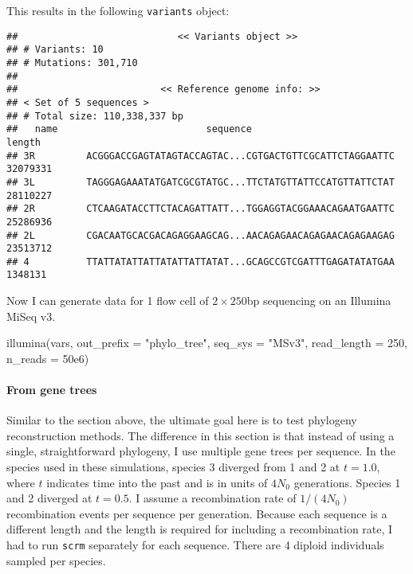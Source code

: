 \documentclass[12pt,]{article}
\newenvironment{Shaded}{}{}
\newcommand{\DataTypeTok}[1]{#1}
\newcommand{\DecValTok}[1]{#1}
\newcommand{\FloatTok}[1]{#1}
\newcommand{\KeywordTok}[1]{\textcolor[rgb]{0.00,0.00,1.00}{#1}}
\newcommand{\NormalTok}[1]{#1}
\newcommand{\StringTok}[1]{\textcolor[rgb]{0.00,0.50,0.50}{#1}}
\let\oldparagraph\paragraph
\renewcommand{\paragraph}[1]{\oldparagraph{#1}\mbox{}}
\begin{document}
This results in the following \texttt{variants} object:

\begin{verbatim}
##                            << Variants object >>
## # Variants: 10
## # Mutations: 301,710
## 
##                         << Reference genome info: >>
## < Set of 5 sequences >
## # Total size: 110,338,337 bp
##   name                          sequence                             length
## 3R         ACGGGACCGAGTATAGTACCAGTAC...CGTGACTGTTCGCATTCTAGGAATTC  32079331
## 3L         TAGGGAGAAATATGATCGCGTATGC...TTCTATGTTATTCCATGTTATTCTAT  28110227
## 2R         CTCAAGATACCTTCTACAGATTATT...TGGAGGTACGGAAACAGAATGAATTC  25286936
## 2L         CGACAATGCACGACAGAGGAAGCAG...AACAGAGAACAGAGAACAGAGAAGAG  23513712
## 4          TTATTATATTATTATATTATTATAT...GCAGCCGTCGATTTGAGATATATGAA   1348131
\end{verbatim}

Now I can generate data for 1 flow cell of \(2 \times 250\)bp sequencing
on an Illumina MiSeq v3.

\begin{Shaded}
\begin{Highlighting}[]
\KeywordTok{illumina}\NormalTok{(vars, }\DataTypeTok{out_prefix =} \StringTok{"phylo_tree"}\NormalTok{, }\DataTypeTok{seq_sys =} \StringTok{"MSv3"}\NormalTok{,}
         \DataTypeTok{read_length =} \DecValTok{250}\NormalTok{, }\DataTypeTok{n_reads =} \FloatTok{50e6}\NormalTok{)}
\end{Highlighting}
\end{Shaded}

\hypertarget{from-gene-trees}{%
\paragraph{From gene trees}\label{from-gene-trees}}

Similar to the section above, the ultimate goal here is to test phylogeny
reconstruction methods.
The difference in this section is that instead of using a single, straightforward
phylogeny, I use multiple gene trees per sequence.
In the species used in these simulations, species 3 diverged from 1 and 2 at \(t = 1.0\),
where \(t\) indicates time into the past and is in units of \(4 N_0\) generations.
Species 1 and 2 diverged at \(t = 0.5\).
I assume a recombination rate of \(1 / (4 N_0)\) recombination events per sequence
per generation.
Because each sequence is a different length and the length is required for including
a recombination rate, I had to run \texttt{scrm} separately for each sequence.
There are 4 diploid individuals sampled per species.
\end{document}
